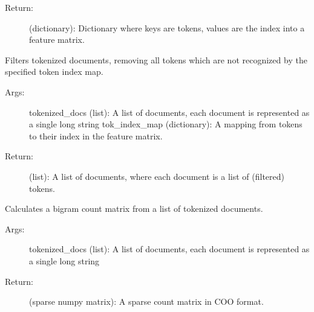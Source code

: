 \documentclass[letterpaper,10pt,english]{sphinxmanual}
\begin{document}
\begin{fulllineitems}
\begin{fulllineitems}
\begin{description}
\item[{Return:}] \leavevmode
(dictionary): Dictionary where keys are tokens, values are the index into a feature matrix.

\end{description}

\end{fulllineitems}


\begin{fulllineitems}
\label{\detokenize{KUHERD:KUHERD.HerdVectorizer.HerdVectorizer.filter_docs}}
Filters tokenized documents, removing all tokens which are not recognized by the specified token index map.
\begin{description}
\item[{Args:}] \leavevmode
tokenized\_docs (list): A list of documents, each document is represented as a single long string
tok\_index\_map (dictionary): A mapping from tokens to their index in the feature matrix.

\item[{Return:}] \leavevmode
(list): A list of documents, where each document is a list of (filtered) tokens.

\end{description}

\end{fulllineitems}


\begin{fulllineitems}
\label{\detokenize{KUHERD:KUHERD.HerdVectorizer.HerdVectorizer.form_bigram_count_matrix}}
Calculates a bigram count matrix from a list of tokenized documents.
\begin{description}
\item[{Args:}] \leavevmode
tokenized\_docs (list): A list of documents, each document is represented as a single long string

\item[{Return:}] \leavevmode
(sparse numpy matrix): A sparse count matrix in COO format.

\end{description}


\end{fulllineitems}
\end{fulllineitems}
\end{document}
